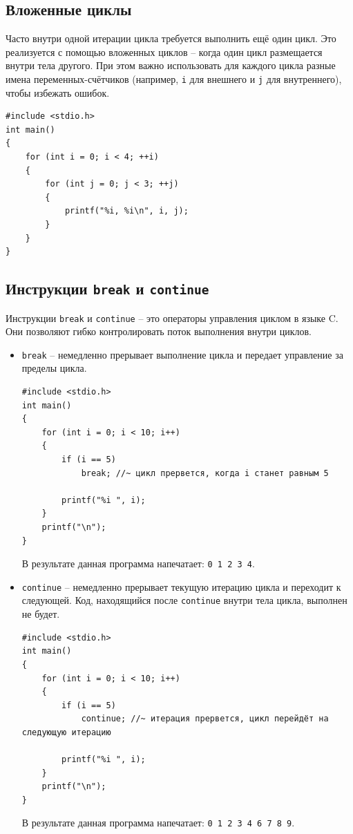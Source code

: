 \documentclass{article}
\begin{document}
\subsection*{Вложенные циклы}
Часто внутри одной итерации цикла требуется выполнить ещё один цикл. Это реализуется с помощью вложенных циклов -- когда один цикл размещается внутри тела другого. При этом важно использовать для каждого цикла разные имена переменных-счётчиков (например, \texttt{i} для внешнего и \texttt{j} для внутреннего), чтобы избежать ошибок.
\begin{lstlisting}
#include <stdio.h>
int main()
{
    for (int i = 0; i < 4; ++i)
    {
        for (int j = 0; j < 3; ++j)
        {
            printf("%i, %i\n", i, j);
        }
    }
}
\end{lstlisting}

\subsection*{Инструкции \texttt{break} и \texttt{continue}}
Инструкции \texttt{break} и \texttt{continue} -- это операторы управления циклом в языке C. Они позволяют гибко контролировать поток выполнения внутри циклов.
\begin{itemize}
\item \texttt{break} -- немедленно прерывает выполнение цикла и передает управление за пределы цикла.
\begin{lstlisting}
#include <stdio.h>
int main()
{
	for (int i = 0; i < 10; i++) 
	{
    	if (i == 5)
        	break; //~ цикл прервется, когда i станет равным 5
        
    	printf("%i ", i);
	}
	printf("\n");
}
\end{lstlisting}
В результате данная программа напечатает: \texttt{0 1 2 3 4}.

\item \texttt{continue} -- немедленно прерывает текущую итерацию цикла и переходит к следующей. Код, находящийся после \texttt{continue} внутри тела цикла, выполнен не будет.
\begin{lstlisting}
#include <stdio.h>
int main()
{
	for (int i = 0; i < 10; i++) 
	{
    	if (i == 5)
        	continue; //~ итерация прервется, цикл перейдёт на следующую итерацию
        
    	printf("%i ", i);
	}
	printf("\n");
}
\end{lstlisting}
В результате данная программа напечатает: \texttt{0 1 2 3 4 6 7 8 9}.
\end{itemize}
\end{document}

